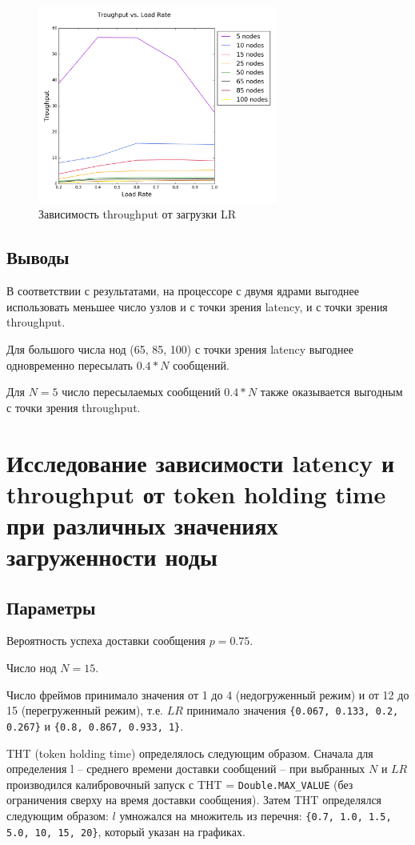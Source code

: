 \documentclass[12pt]{article}
\begin{document}
\begin{figure}[H]
\centering
\includegraphics[width=0.7\textwidth]{Plots/TLR.png}
\caption{Зависимость throughput от загрузки LR}
\end{figure}

\subsection{Выводы}
В соответствии с результатами, на процессоре с двумя ядрами выгоднее использовать меньшее число узлов и с точки зрения latency, и с точки зрения throughput.

Для большого числа нод (65, 85, 100) с точки зрения latency выгоднее одновременно пересылать $0.4 * N$ сообщений.

Для $N = 5$ число пересылаемых сообщений $0.4 * N$ также оказывается выгодным с точки зрения throughput. 

\section{Исследование зависимости latency и throughput от token holding time при различных значениях загруженности ноды}

\subsection{Параметры}
Вероятность успеха доставки сообщения $p=0.75$.

Число нод $N = 15$.

Число фреймов принимало значения от 1 до 4 (недогруженный режим) и от 12 до 15 (перегруженный режим), т.е. $LR$ принимало значения \lstinline|{0.067, 0.133, 0.2, 0.267}| и \lstinline|{0.8, 0.867, 0.933, 1}|.

THT (token holding time) определялось следующим образом. Сначала  для определения l – среднего времени доставки сообщений – при выбранных $N$ и $LR$ производился калибровочный запуск с THT = \lstinline|Double.MAX_VALUE| (без ограничения сверху на время доставки сообщения). Затем THT определялся следующим образом: $l$ умножался на множитель из перечня: \lstinline|{0.7, 1.0, 1.5, 5.0, 10, 15, 20}|, который указан на графиках.
\newpage
\end{document}
